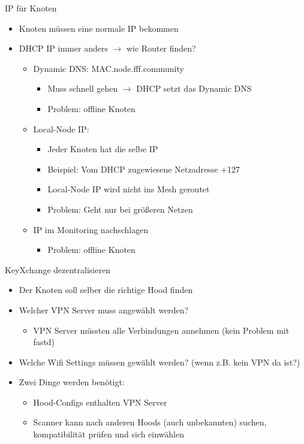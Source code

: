 \begin{frame}{IP für Knoten}
    \begin{itemize}
        \item Knoten müssen eine normale IP bekommen
        \item DHCP IP immer anders $\rightarrow$ wie Router finden?
        \begin{itemize}
            \item Dynamic DNS: MAC.node.fff.community
            \begin{itemize}
                \item Muss schnell gehen $\rightarrow$ DHCP setzt das Dynamic DNS
                \item Problem: offline Knoten
            \end{itemize}
            \item Local-Node IP:
            \begin{itemize}
                \item Jeder Knoten hat die selbe IP
                \item Beispiel: Vom DHCP zugewiesene Netzadresse +127
                \item Local-Node IP wird nicht ins Mesh geroutet
                \item Problem: Geht nur bei größeren Netzen
            \end{itemize}
            \item IP im Monitoring nachschlagen
            \begin{itemize}
                \item Problem: offline Knoten
            \end{itemize}
        \end{itemize}
    \end{itemize}
\end{frame}

\begin{frame}{KeyXchange dezentralisieren}
    \begin{itemize}
        \item Der Knoten soll selber die richtige Hood finden
        \item Welcher VPN Server muss angewählt werden?
        \begin{itemize}
            \item VPN Server müssten alle Verbindungen annehmen (kein
                Problem mit fastd)
        \end{itemize}
        \item Welche Wifi Settings müssen gewählt werden? (wenn z.B.
            kein VPN da ist?)
        \item Zwei Dinge werden benötigt: 
        \begin{itemize}
            \item Hood-Configs enthalten VPN Server
            \item Scanner kann nach anderen Hoods (auch unbekannten)
                suchen, kompatibilität prüfen und sich einwählen
        \end{itemize}
    \end{itemize}
\end{frame}

